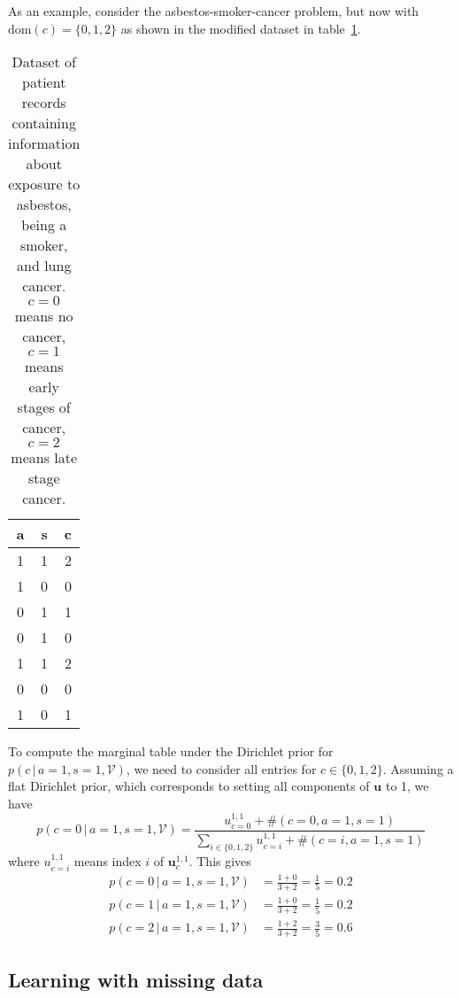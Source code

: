 \documentclass{article}
\newcommand{\giv}{\,|\,}
\begin{document}
As an example, consider the asbestos-smoker-cancer problem, but now with $\text{dom}(c) = \{0, 1, 2\}$ as shown in the modified dataset in table~\ref{tab:records2}. 

\begin{table}[H]
    \centering
    \caption{Dataset of patient records containing information about exposure to asbestos, being a smoker, and lung cancer. $c=0$ means no cancer, $c=1$ means early stages of cancer, $c=2$ means late stage cancer. }\label{tab:records2}
    \vspace{5mm}
    \begin{tabular}{ccc}
    \hline
        \textbf{a} & \textbf{s} & \textbf{c} \\ \hline
        1 & 1 & 2 \\
        1 & 0 & 0 \\
        0 & 1 & 1 \\
        0 & 1 & 0 \\
        1 & 1 & 2 \\
        0 & 0 & 0 \\
        1 & 0 & 1
    \end{tabular}
\end{table}

\noindent To compute the marginal table under the Dirichlet prior for $p(c \giv a = 1, s = 1, \mathcal{V})$, we need to consider all entries for $c \in \{0, 1, 2\}$. Assuming a flat Dirichlet prior, which corresponds to setting all components of $\mathbf{u}$ to 1, we have 
$$
    p(c = 0 \giv a = 1, s = 1, \mathcal{V}) = \frac{u_{c=0}^{1, 1} + \#(c = 0, a = 1, s = 1)}{\sum_{i \in \{0, 1, 2\}} u_{c=i}^{1, 1} + \#(c = i, a = 1, s = 1)}
$$
\noindent where $u_{c=i}^{1, 1}$ means index $i$ of $\mathbf{u}_c^{1, 1}$. This gives
\begin{align*}
    p(c = 0 \giv a = 1, s = 1, \mathcal{V}) &= \frac{1+0}{3+2} = \frac{1}{5} = 0.2 \\[1em]
    p(c = 1 \giv a = 1, s = 1, \mathcal{V}) &= \frac{1+0}{3+2} = \frac{1}{5} = 0.2 \\[1em]
    p(c = 2 \giv a = 1, s = 1, \mathcal{V}) &= \frac{1+2}{3+2} = \frac{3}{5} = 0.6
\end{align*}

\subsection{Learning with missing data}
\end{document}
